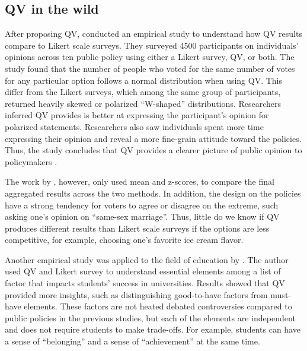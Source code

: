 \subsection{QV in the wild}
After proposing QV,
\textcite{quarfoot2017quadratic} conducted an 
empirical study to understand how 
QV results compare to Likert scale surveys.
They surveyed 4500 participants 
on individuals' opinions
across ten public policy
using either a Likert survey, QV, or both.
The study found that the number of people
who voted for the same number of votes
for any particular option 
follows a normal distribution when using QV.
This differ from the Likert surveys,
which among the same group of participants,
returned heavily skewed 
or polarized ``W-shaped'' distributions.
Researchers inferred 
QV provides is better at expressing the participant's opinion
for polarized statements.
Researchers also saw individuals 
spent more time expressing their opinion
and reveal a more fine-grain attitude 
toward the policies.
Thus, the study concludes that 
QV provides a clearer picture 
of public opinion to policymakers
\cite{quarfoot2017quadratic}.

The work by \textcite{quarfoot2017quadratic}, however,
only used mean and z-scores,
to compare the final aggregated results 
across the two methods.
In addition, 
the design on the policies 
have a strong tendency for voters
to agree or disagree on the extreme,
such asking one's opinion on ``same-sex marriage''.
Thus, little do we know if
QV produces different results 
than Likert scale surveys
if the options are less competitive,
for example, choosing one's favorite ice cream flavor.\par

Another empirical study was applied to 
the field of education 
by \textcite{naylor2017first}. 
The author used QV and Likert survey
to understand essential elements 
among a list of factor
that impacts students' success in universities.
Results showed that QV provided more insights, 
such as distinguishing good-to-have factors from must-have elements.
These factors are not heated debated controversies
compared to public policies in the previous studies, 
but each of the elements are independent and does not require 
students to make trade-offs.
For example, students can have a sense of ``belonging'' and
a sense of ``achievement'' at the same time.

